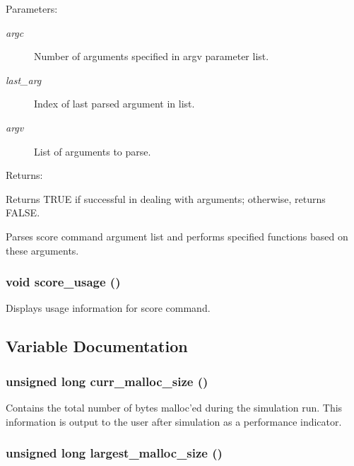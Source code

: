 \begin{Desc}
\item[Parameters: ]\par
\begin{description}
\item[{\em 
argc}]Number of arguments specified in argv parameter list. \item[{\em 
last\_\-arg}]Index of last parsed argument in list. \item[{\em 
argv}]List of arguments to parse.\end{description}
\end{Desc}
\begin{Desc}
\item[Returns: ]\par
Returns TRUE if successful in dealing with arguments; otherwise, returns FALSE.\end{Desc}
Parses score command argument list and performs specified functions based on these arguments. 
\subsubsection{\setlength{\rightskip}{0pt plus 5cm}void score\_\-usage ()}\label{score_8c_a8}


Displays usage information for score command. 

\subsection{Variable Documentation}
\subsubsection{\setlength{\rightskip}{0pt plus 5cm}unsigned long curr\_\-malloc\_\-size ()}\label{score_8c_a5}


Contains the total number of bytes malloc'ed during the simulation run. This information is output to the user after simulation as a performance indicator. 
\subsubsection{\setlength{\rightskip}{0pt plus 5cm}unsigned long largest\_\-malloc\_\-size ()}\label{score_8c_a4}


